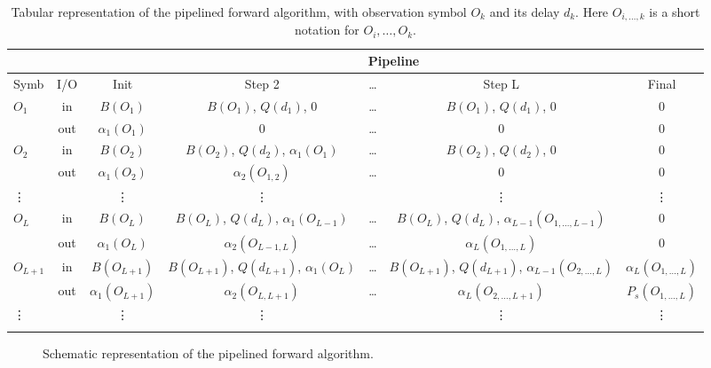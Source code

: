 \documentclass[mscthesis]{usiinfthesis}
\begin{document}
\begin{table}
    \footnotesize
    \begin{center}
    \begin{tabular}{|l|*{6}{c|}}
    \cline{3-7}
    \multicolumn{2}{c|}{} & \multicolumn{5}{c|}{Pipeline}\\
    \hline
    Symb & I/O & Init & Step 2 & \dots & Step L & Final \\
    \hline
    \hline
    $O_1$ & in
        & $B(O_1)$ & $B(O_1)$, $Q(d_1)$, 0
        & \dots
        & $B(O_1)$, $Q(d_1)$, 0 & 0 \\
        & out
        & $\alpha_1(O_1)$ & 0
        & \dots
        & 0 & 0 \\
    \arrayrulecolor{mysmokegray}\hline
    $O_2$ & in
        & $B(O_2)$ & $B(O_2)$, $Q(d_2)$, $\alpha_1(O_1)$
        & \dots
        & $B(O_2)$, $Q(d_2)$, 0 & 0 \\
        & out
        & $\alpha_1(O_2)$ & $\alpha_2(O_{1,2})$
        & \dots
        & 0 & 0 \\
    \hline
    \vdots & & \vdots & \vdots & & \vdots & \vdots \\
    \hline
    $O_{L}$ & in
        & $B(O_L)$ & $B(O_L)$, $Q(d_L)$, $\alpha_1(O_{L-1})$
        & \dots
        & $B(O_L)$, $Q(d_L)$, $\alpha_{L-1}(O_{1,\dots,{L-1}})$ & 0 \\
        & out
        & $\alpha_1(O_L)$ & $\alpha_2(O_{{L-1},L})$
        & \dots
        & $\alpha_L(O_{1,\dots,L})$ & 0 \\
    \hline
    $O_{L+1}$ & in
        & $B(O_{L+1})$ & $B(O_{L+1})$, $Q(d_{L+1})$, $\alpha_1(O_L)$
        & \dots
        & $B(O_{L+1})$, $Q(d_{L+1})$, $\alpha_{L-1}(O_{2,\dots,L})$ & $\alpha_L(O_{1,\dots,L})$ \\
        & out
        & $\alpha_1(O_{L+1})$ & $\alpha_2(O_{L,{L+1}})$
        & \dots
        & $\alpha_L(O_{2,\dots,{L+1}})$ & $P_s(O_{1,\dots,L})$ \\
    \hline
    \vdots & & \vdots & \vdots & & \vdots & \vdots \\
    \arrayrulecolor{black}\hline
    \end{tabular}
    \end{center}
    \caption{Tabular representation of the pipelined forward algorithm, with
        observation symbol $O_k$ and its delay $d_k$. Here $O_{i, \dots, k}$ is
        a short notation for $O_i, \dots, O_k$.}
    \label{tab:pipeline}
\end{table}

\begin{figure}
    \centering
    
    \caption{Schematic representation of the pipelined forward algorithm.}
    \label{fig:pipeline}
\end{figure}
\end{document}
